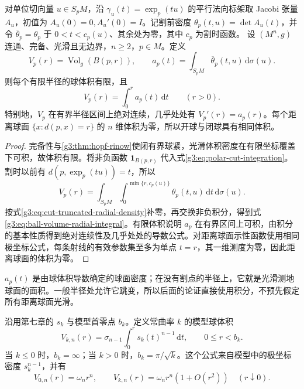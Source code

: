 \begin{proposition}\label{g3:prop:ball-volume-radial-density}
	对单位切向量 \(u\in S_pM\)，沿 \(\gamma_u(t)=\exp_p(tu)\) 的平行法向标架取 Jacobi 张量 \(A_u\)，初值为 \(A_u(0)=0,A_u'(0)=I\)。记割前密度 \(\theta_p(t,u)=\det A_u(t)\)，并令 \(\overline\theta_p=\theta_p\) 于 \(0<t<c_p(u)\)、其余处为零，其中 \(c_p\) 为割时函数。
	设 \((M^n,g)\) 连通、完备、光滑且无边界，\(n\ge2\)，\(p\in M\)。定义
	\[
		V_p(r)=\operatorname{Vol}_g(B(p,r)),\qquad
		a_p(t)=\int_{S_pM}\overline\theta_p(t,u)\,\mathrm d\sigma(u).
	\]
	则每个有限半径的球体积有限，且
	\begin{equation}\label{g3:eq:ball-volume-radial-integral}
		V_p(r)=\int_0^r a_p(t)\,\mathrm dt\qquad(r>0).
	\end{equation}
	特别地，\(V_p\) 在有界半径区间上绝对连续，几乎处处有 \(V_p'(r)=a_p(r)\)。每个距离球面 \(\{x:d(p,x)=r\}\) 的 \(n\) 维体积为零，所以开球与闭球具有相同体积。
\end{proposition}
\begin{proof}
	完备性与\cref{g3:thm:hopf-rinow}使闭有界球紧，光滑体积密度在有限坐标覆盖下可积，故体积有限。将非负函数 \(\mathbf1_{B(p,r)}\) 代入式\eqref{g3:eq:polar-cut-integration}。割时以前有 \(d(p,\exp_p(tu))=t\)，所以
	\[
		V_p(r)=\int_{S_pM}\int_0^{\min\{r,c_p(u)\}}\theta_p(t,u)\,\mathrm dt\,\mathrm d\sigma(u).
	\]
	按式\eqref{g3:eq:cut-truncated-radial-density}补零，再交换非负积分，得到式\eqref{g3:eq:ball-volume-radial-integral}。有限体积说明 \(a_p\) 在有界区间上可积，由积分的基本性质得到绝对连续性及几乎处处的导数公式。对距离球面示性函数使用相同极坐标公式，每条射线的有效参数集至多为单点 \(t=r\)，其一维测度为零，因此距离球面的体积为零。
\end{proof}

\(a_p(t)\) 是由球体积导数确定的球面密度；在没有割点的半径上，它就是光滑测地球面的面积。一般半径处允许它跳变，所以后面的论证直接使用积分，不预先假定所有距离球面光滑。

\ProseParagraphBreak

沿用第七章的 \(s_k\) 与模型首零点 \(b_k\)。定义常曲率 \(k\) 的模型球体积
\begin{equation}\label{g3:eq:model-ball-volume}
	V_{k,n}(r)=\sigma_{n-1}\int_0^r s_k(t)^{n-1}\,\mathrm dt,
	\qquad 0\le r<b_k.
\end{equation}
当 \(k\le0\) 时，\(b_k=\infty\)；当 \(k>0\) 时，\(b_k=\pi/\sqrt{k}\)。这个公式来自模型中的极坐标密度 \(s_k^{n-1}\)，并有
\[
	V_{0,n}(r)=\omega_n r^n,\qquad
	V_{k,n}(r)=\omega_n r^n(1+O(r^2))\quad(r\downarrow0).
\]

